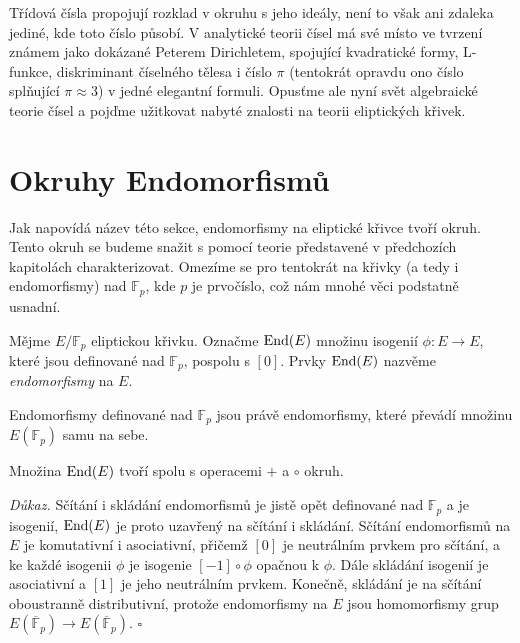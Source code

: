 \documentclass[12pt]{report}
\begin{document}
Třídová čísla propojují rozklad v okruhu s jeho ideály, není to však ani zdaleka jediné, kde toto číslo působí. V analytické teorii čísel má své místo ve tvrzení známem jako  dokázané Peterem Dirichletem, spojující kvadratické formy, L-funkce, diskriminant číselného tělesa i číslo $\pi$ (tentokrát opravdu ono číslo splňující $\pi \approx 3$) v jedné elegantní formuli. Opusťme ale nyní svět algebraické teorie čísel a pojďme užitkovat nabyté znalosti na teorii eliptických křivek.
 
 
\chapter{Okruhy Endomorfismů} 
 
Jak napovídá název této sekce, endomorfismy na eliptické křivce tvoří okruh. Tento okruh se budeme snažit s pomocí teorie představené v předchozích kapitolách charakterizovat. Omezíme se pro tentokrát na křivky (a tedy i endomorfismy) nad $\mathbb{F}_p$, kde $p$ je prvočíslo, což nám mnohé věci podstatně usnadní.
\begin{definice}
Mějme $E/\mathbb{F}_p$ eliptickou křivku. Označme $\operatorname{End}(E)$ množinu isogenií $\phi : E \longrightarrow E$, které jsou definované nad $\mathbb{F}_p$, pospolu s $[0]$. Prvky $\operatorname{End}(E)$ nazvěme \textit{endomorfismy} na $E$.
\end{definice}

Endomorfismy definované nad $\mathbb{F}_p$ jsou právě endomorfismy, které převádí množinu $E(\mathbb{F}_p)$ samu na sebe. 
 
\begin{veta}
Množina $\operatorname{End}(E)$ tvoří spolu s operacemi $+$ a $\circ$ okruh.
\end{veta}
\noindent \textit{Důkaz.} Sčítání i skládání endomorfismů je jistě opět definované nad $\mathbb{F}_p$ a je isogenií, $\operatorname{End}(E)$ je proto uzavřený na sčítání i skládání. Sčítání endomorfismů na $E$ je komutativní i asociativní, přičemž $[0]$ je neutrálním prvkem pro sčítání, a ke každé isogenii $\phi$ je isogenie $[-1] \circ \phi$ opačnou k $\phi$. Dále skládání isogenií je asociativní a $[1]$ je jeho neutrálním prvkem. Konečně, skládání je na sčítání oboustranně distributivní, protože endomorfismy na $E$ jsou homomorfismy grup $E(\overline{\mathbb{F}}_p) \longrightarrow E(\overline{\mathbb{F}}_p)$. \hfill $\square$\\
\end{document}
